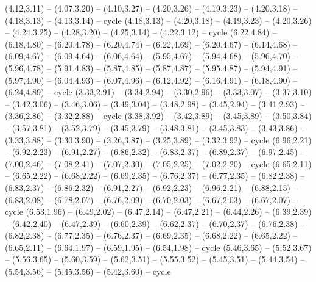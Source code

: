 \expandafter\def\csname geo:gebiet:SUR\endcsname{
  (4.12,3.11) -- (4.07,3.20) -- (4.10,3.27) -- (4.20,3.26) -- (4.19,3.23) -- (4.20,3.18) -- (4.18,3.13) -- (4.13,3.14) -- cycle}
\expandafter\def\csname geo:gebiet:FRA\endcsname{
  (4.18,3.13) -- (4.20,3.18) -- (4.19,3.23) -- (4.20,3.26) -- (4.24,3.25) -- (4.28,3.20) -- (4.25,3.14) -- (4.22,3.12) -- cycle
  (6.22,4.84) -- (6.18,4.80) -- (6.20,4.78) -- (6.20,4.74) -- (6.22,4.69) -- (6.20,4.67) -- (6.14,4.68) -- (6.09,4.67) -- (6.09,4.64) -- (6.06,4.64) -- (5.95,4.67) -- (5.94,4.68) -- (5.96,4.70) -- (5.96,4.78) -- (5.91,4.83) -- (5.87,4.85) -- (5.87,4.87) -- (5.95,4.87) -- (5.94,4.91) -- (5.97,4.90) -- (6.04,4.93) -- (6.07,4.96) -- (6.12,4.92) -- (6.16,4.91) -- (6.18,4.90) -- (6.24,4.89) -- cycle}
\expandafter\def\csname geo:gebiet:ECU\endcsname{
  (3.33,2.91) -- (3.34,2.94) -- (3.30,2.96) -- (3.33,3.07) -- (3.37,3.10) -- (3.42,3.06) -- (3.46,3.06) -- (3.49,3.04) -- (3.48,2.98) -- (3.45,2.94) -- (3.41,2.93) -- (3.36,2.86) -- (3.32,2.88) -- cycle}
\expandafter\def\csname geo:gebiet:PRI\endcsname{
  }
\expandafter\def\csname geo:gebiet:JAM\endcsname{
  }
\expandafter\def\csname geo:gebiet:CUB\endcsname{
  (3.38,3.92) -- (3.42,3.89) -- (3.45,3.89) -- (3.50,3.84) -- (3.57,3.81) -- (3.52,3.79) -- (3.45,3.79) -- (3.48,3.81) -- (3.45,3.83) -- (3.43,3.86) -- (3.33,3.88) -- (3.30,3.90) -- (3.26,3.87) -- (3.25,3.89) -- (3.32,3.92) -- cycle}
\expandafter\def\csname geo:gebiet:ZWE\endcsname{
  (6.96,2.21) -- (6.92,2.23) -- (6.91,2.27) -- (6.86,2.32) -- (6.83,2.37) -- (6.89,2.37) -- (6.97,2.45) -- (7.00,2.46) -- (7.08,2.41) -- (7.07,2.30) -- (7.05,2.25) -- (7.02,2.20) -- cycle}
\expandafter\def\csname geo:gebiet:BWA\endcsname{
  (6.65,2.11) -- (6.65,2.22) -- (6.68,2.22) -- (6.69,2.35) -- (6.76,2.37) -- (6.77,2.35) -- (6.82,2.38) -- (6.83,2.37) -- (6.86,2.32) -- (6.91,2.27) -- (6.92,2.23) -- (6.96,2.21) -- (6.88,2.15) -- (6.83,2.08) -- (6.78,2.07) -- (6.76,2.09) -- (6.70,2.03) -- (6.67,2.03) -- (6.67,2.07) -- cycle}
\expandafter\def\csname geo:gebiet:NAM\endcsname{
  (6.53,1.96) -- (6.49,2.02) -- (6.47,2.14) -- (6.47,2.21) -- (6.44,2.26) -- (6.39,2.39) -- (6.42,2.40) -- (6.47,2.39) -- (6.60,2.39) -- (6.62,2.37) -- (6.70,2.37) -- (6.76,2.38) -- (6.82,2.38) -- (6.77,2.35) -- (6.76,2.37) -- (6.69,2.35) -- (6.68,2.22) -- (6.65,2.22) -- (6.65,2.11) -- (6.64,1.97) -- (6.59,1.95) -- (6.54,1.98) -- cycle}
\expandafter\def\csname geo:gebiet:SEN\endcsname{
  (5.46,3.65) -- (5.52,3.67) -- (5.56,3.65) -- (5.60,3.59) -- (5.62,3.51) -- (5.55,3.52) -- (5.45,3.51) -- (5.44,3.54) -- (5.54,3.56) -- (5.45,3.56) -- (5.42,3.60) -- cycle}
